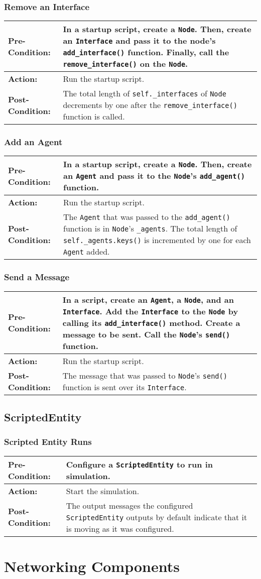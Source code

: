 \documentclass[titlepage]{article}
\newcommand{\testcase}[3]{
    \begin{center}
    \begin{tabular}{| l | p{0.7\textwidth}|}
        \hline
        \rowcolor[gray]{0.8}\textbf{Pre-Condition:} & #1 \\ \hline
        \textbf{Action:} & #2 \\ \hline
        \rowcolor[gray]{0.8}\textbf{Post-Condition:} & #3 \\ \hline
    \end{tabular}
    \end{center}
}
\begin{document}
\subsubsection{Remove an Interface}
\testcase{In a startup script, create a \texttt{Node}. Then, create an \texttt{Interface} and pass it to the node's \texttt{add\_interface()} function. Finally, call the \texttt{remove\_interface()} on the \texttt{Node}.}{Run the startup script.}{The total length of \texttt{self.\_interfaces} of \texttt{Node} decrements by one after the \texttt{remove\_interface()} function is called.}

\subsubsection{Add an Agent}
\testcase{In a startup script, create a \texttt{Node}.  Then, create an \texttt{Agent} and pass it to the \texttt{Node}'s \texttt{add\_agent()} function.}{Run the startup script.}{The \texttt{Agent} that was passed to the \texttt{add\_agent()} function is in \texttt{Node}'s \texttt{\_agents}. The total length of \texttt{self.\_agents.keys()} is incremented by one for each \texttt{Agent} added.}

\subsubsection{Send a Message}
\testcase{In a script, create an \texttt{Agent}, a \texttt{Node}, and an \texttt{Interface}.  Add the \texttt{Interface} to the \texttt{Node} by calling its \texttt{add\_interface()} method. Create a message to be sent.  Call the \texttt{Node}'s \texttt{send()} function.}{Run the startup script.}{The message that was passed to \texttt{Node}'s \texttt{send()} function is sent over its \texttt{Interface}.}

\subsection{ScriptedEntity}
\subsubsection{Scripted Entity Runs}
\testcase{Configure a \texttt{ScriptedEntity} to run in simulation.}{Start the simulation.}{The output messages the configured \texttt{ScriptedEntity} outputs by default indicate that it is moving as it was configured.}

\section{Networking Components}
\end{document}
